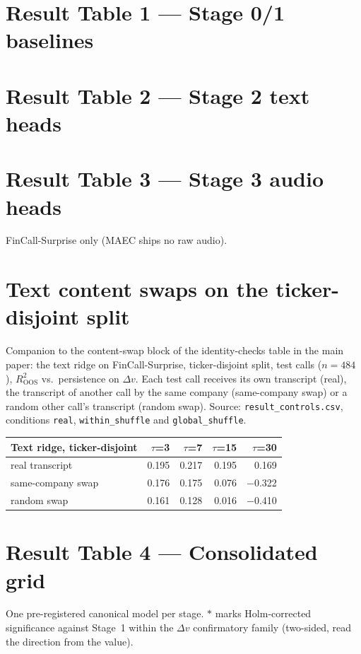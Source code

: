\documentclass[10pt]{article}
\newcommand{\dv}{\ensuremath{\Delta v}\xspace}
\begin{document}
\section*{Result Table 1 --- Stage 0/1 baselines}

\clearpage

\section*{Result Table 2 --- Stage 2 text heads}

\clearpage

\section*{Result Table 3 --- Stage 3 audio heads}
FinCall-Surprise only (MAEC ships no raw audio).

\clearpage

\section*{Text content swaps on the ticker-disjoint split}
Companion to the content-swap block of the identity-checks table in the main
paper: the text ridge on FinCall-Surprise, ticker-disjoint split, test calls
($n{=}484$), $R^2_{\mathrm{OOS}}$ vs.\ persistence on $\Delta v$. Each test call
receives its own transcript (real), the transcript of another call by the same
company (same-company swap) or a random other call's transcript (random swap).
Source: \texttt{result\_controls.csv}, conditions \texttt{real},
\texttt{within\_shuffle} and \texttt{global\_shuffle}.

\begin{center}
\begin{tabular}{lrrrr}
\toprule
Text ridge, ticker-disjoint & $\tau$=3 & $\tau$=7 & $\tau$=15 & $\tau$=30 \\
\midrule
real transcript & 0.195 & 0.217 & 0.195 & 0.169 \\
same-company swap & 0.176 & 0.175 & 0.076 & $-$0.322 \\
random swap & 0.161 & 0.128 & 0.016 & $-$0.410 \\
\bottomrule
\end{tabular}
\end{center}
\clearpage

\section*{Result Table 4 --- Consolidated grid}
One pre-registered canonical model per stage. $*$ marks Holm-corrected
significance against Stage~1 within the \dv{} confirmatory family (two-sided, read
the direction from the value).

\end{document}

